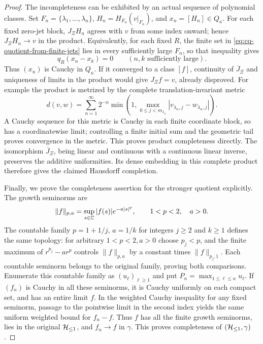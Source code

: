 \begin{proof}
The incompleteness can be exhibited by an actual sequence of
polynomial classes. Set $F_n=\{\lambda_1,\ldots,\lambda_n\}$,
$H_n=H_{F_n}(v|_{F_n})$, and $x_n=[H_n]\in Q_\kappa$.
For each fixed zero-jet block, $J_\Xi H_n$ agrees with $v$
from some index onward; hence $J_\Xi H_n\to v$ in the product.
Equivalently, for each fixed $R$, the finite set in
\eqref{eq:cq-quotient-from-finite-jets} lies in every sufficiently
large $F_n$, so that inequality gives
\[
 q_R(x_n-x_k)=0\qquad(n,k\text{ sufficiently large}).
\]
Thus $(x_n)$ is Cauchy in $Q_\kappa$. If it converged to a
class $[f]$, continuity of $\overline J_\Xi$ and uniqueness of
limits in the product would give $J_\Xi f=v$, already disproved.
For example the product is metrized by the complete
translation-invariant metric
\[
 d(v,w)=\sum_{n=1}^\infty2^{-n}
       \min\!\left(1,\max_{0\leq j<m_{\lambda_n}}
                          |v_{\lambda_n,j}-w_{\lambda_n,j}|\right).
\]
A Cauchy sequence for this metric is Cauchy in each finite
coordinate block, so has a coordinatewise limit; controlling a
finite initial sum and the geometric tail proves convergence in
the metric. This proves product completeness directly. The
isomorphism $\overline J_\Xi$, being linear and continuous
with a continuous linear inverse, preserves the additive
uniformities. Its dense embedding in this complete product
therefore gives the claimed Hausdorff completion.

Finally, we prove the completeness assertion for the stronger
quotient explicitly. The growth seminorms are
\[
 \|f\|_{p,a}=\sup_{s\in\mathbb C}|f(s)|e^{-a|s|^p},
 \qquad 1<p<2,\quad a>0.
\]
The countable family $p=1+1/j$, $a=1/k$ for integers $j\geq2$
and $k\geq1$ defines the same topology: for arbitrary $1<p<2,a>0$
choose $p_j<p$, and the finite maximum of
$r^{p_j}-ar^p$ controls $\|f\|_{p,a}$ by a constant times
$\|f\|_{p_j,1}$. Each countable seminorm belongs to the original
family, proving both comparisons. Enumerate this countable family
as $(u_\ell)_{\ell\geq1}$ and put
$P_n=\max_{1\leq\ell\leq n}u_\ell$.
If $(f_n)$ is Cauchy in all these seminorms, it is Cauchy uniformly
on each compact set, and has an entire limit $f$. In the weighted
Cauchy inequality for any fixed seminorm, passage to the
pointwise limit in the second index yields the same uniform
weighted bound for $f_n-f$. Thus $f$ has all the finite growth
seminorms, lies in the original $\mathcal H_{\leq 1}$, and $f_n\to f$ in
$\gamma$. This proves completeness of $(\mathcal H_{\leq 1},\gamma)$.


\end{proof}

